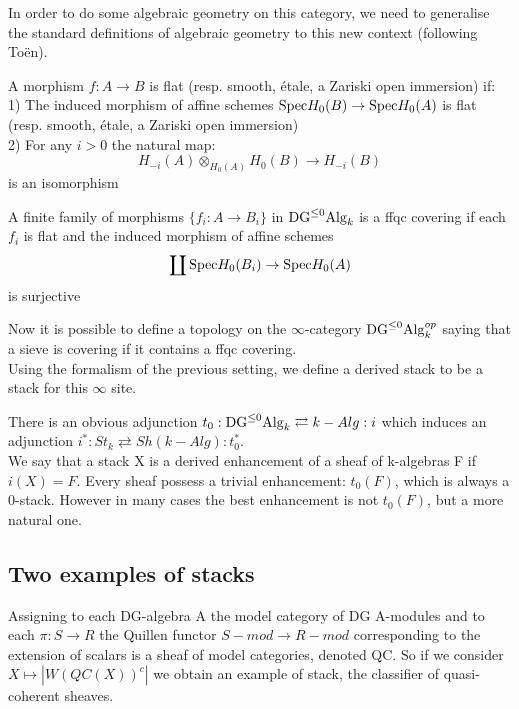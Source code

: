 \begin{refsection}
In order to do some algebraic geometry on this category, we need to generalise the standard definitions of algebraic geometry to this new context (following To\"en).\\
\begin{defin}
A morphism $f:A\to B$ is flat (resp. smooth, \'etale, a Zariski open immersion) if:\\
1) The induced morphism of affine schemes $\mathrm{Spec} H_0(B)\to \mathrm{Spec} H_0(A)$ is flat (resp. smooth, \'etale, a Zariski open immersion)\\
2) For any $i>0$ the natural map:
$$H_{-i}(A)\otimes_{H_0(A)}H_0(B)\to H_{-i}(B) $$
is an isomorphism
\end{defin}


\begin{defin}
A finite family of morphisms $\{ f_i:A\to B_i\}$ in $\mathrm{DG}^{\le 0}\mathrm{Alg}_k$ is a ffqc covering if each $f_i$ is flat and the induced morphism of affine schemes
$$\coprod \mathrm{Spec} H_0(B_i)\to \mathrm{Spec} H_0(A)$$
is surjective
\end{defin}

Now it is possible to define a topology on the $\infty$-category $\mathrm{DG}^{\le 0}\mathrm{Alg}_k^{op}$ saying that a sieve is covering if it contains a ffqc covering.\\
Using the formalism of the previous setting, we define a derived stack to be a stack for this $\infty$ site.\\


\begin{rmk}
There is an obvious adjunction $t_0:\mathrm{DG}^{\le 0}\mathrm{Alg}_k\rightleftarrows k-Alg:i$ which induces an adjunction $i^*:St_k\rightleftarrows Sh(k-Alg):t_0^*$.\\
We say that a stack X is a derived enhancement of a sheaf of k-algebras F if $i(X)=F$. Every sheaf possess a trivial enhancement: $t_0(F)$, which
is always a 0-stack.
However in many cases the best enhancement is not $t_0(F)$, but a more natural one.
\end{rmk}


\subsection{Two examples of stacks}

\begin{defin}
Assigning to each DG-algebra A the model category of DG A-modules and to each $\pi: S\to R$ the Quillen functor $S-mod\to R-mod$ corresponding to the extension of scalars
is a sheaf of model categories, denoted QC. So if we consider $X\mapsto |W(QC(X))^c|$ we obtain an example of stack, the classifier of quasi-coherent sheaves. 
\end{defin}


\end{refsection}
